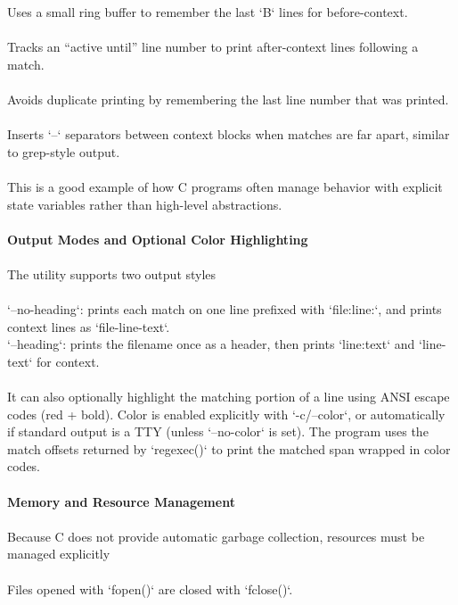 \documentclass{article}
\begin{document}
{\normalsize Uses a small ring buffer to remember the last `B` lines for befor}{\normalsize e-context.}\\
\\
{\normalsize Tracks an “active until” line number to print after-context lines following a match.}\\
\\
{\normalsize Avoids duplicate printing by remembering the last line number that was printed.}\\
\\
{\normalsize Inserts `--` separators between context blocks when matches are far apart, si}{\normalsize milar to grep-}{\normalsize style output.}\\
\\
{\normalsize This is a good example of how C programs often manage behavior with explicit state variables rather than high-level abstractions.}\\
\\
{\large \textbf{Output Modes and Optional Color Highlighting}}\\
\\
{\normalsize The utility supports two output styles}\\
\\
{\normalsize `--no-head}{\normalsize ing`: prints each match on one line prefixed with `}{\normalsize file:line}{\normalsize :`, and prints context lines as `file-line-text`.}\\
{\normalsize `--heading`: prints the filename once as a header, then prints `}{\normalsize line:text}{\normalsize ` and `line-text` for context.}\\
\\
{\normalsize It can also optionally highlight the mat}{\normalsize ching portion of a line using ANSI escape codes (red + bold). Color is enabled explicitly with `-c/--color`, or automatically if standard output is a TTY (unless `--no-color` is set). The program uses the match offsets returned by `}{\normalsize regexec}{\normalsize (}{\normalsize )` to print the }{\normalsize matched span wrapped in color codes.}\\
\\
{\large \textbf{Memory and Resource Management}}\\
\\
{\normalsize Because C does not provide automatic garbage collection, resources must be managed explicitly}\\
\\
{\normalsize Files opened with `}{\normalsize fopen}{\normalsize (}{\normalsize )` are closed with `}{\normalsize fclose}{\normalsize ()`.}\\
\end{document}
